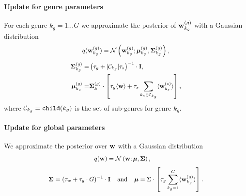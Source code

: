 \paragraph{Update for genre parameters}
\noindent For each genre $k_g=1\dots G$ we approximate the posterior of $\mathbf{w}^{(g)}_{k_g}$ with a Gaussian distribution
\begin{equation}
\begingroup\makeatletter\def\f@size{\fsize}\check@mathfonts
\def\maketag@@@#1{\hbox{\m@th\large\normalfont#1}}%
\begin{aligned}
q(\w^{(g)}_{k_g})=\mathcal{N}\left(\w^{(g)}_{k_g}; \bmu^{(g)}_{k_g}, \bSigma^{(g)}_{k_g} \right),
\end{aligned}\endgroup
\end{equation} 
\begin{equation}
\begingroup\makeatletter\def\f@size{\fsize}\check@mathfonts
\def\maketag@@@#1{\hbox{\m@th\large\normalfont#1}}%
\begin{aligned}
\bSigma^{(g)}_{k_g} = & \left(\tau_g+|\mathcal{C}_{k_g}|\tau_s\right)^{-1} \cdot  \textbf{I}, \nonumber \\
\bmu^{(g)}_{k_g}=&\bSigma^{(g)}_k \cdot\left[\tau_g \langle \w \rangle  +\tau_s\sum_{k_s\in \mathcal{C}_{k_g}}\langle \w^{(s)}_{k_s}\rangle \right],
\end{aligned}\endgroup
\end{equation}
where $\mathcal{C}_{k_g}=\texttt{child}(k_g)$ is the set of sub-genres for genre $k_g$.

\paragraph{Update for global parameters}
\noindent We approximate the posterior over $\mathbf{w}$ with a Gaussian distribution  
\begin{equation}
\begingroup\makeatletter\def\f@size{\fsize}\check@mathfonts
\def\maketag@@@#1{\hbox{\m@th\large\normalfont#1}}%
\begin{aligned}
& q(\w)=\mathcal{N}\left(\w ; \bmu, \bSigma \right), 
\label{eq:q_w}
\end{aligned}\endgroup
\end{equation} 
\begin{equation}
\begingroup\makeatletter\def\f@size{\fsize}\check@mathfonts
\def\maketag@@@#1{\hbox{\m@th\large\normalfont#1}}%
\begin{aligned}
\bSigma=\left(\tau_w+ \tau_g \cdot G \right)^{-1} \cdot \I \quad \text{and} \quad \bmu=\Sigma\cdot\left[\tau_g\sum_{k_g=1}^{G} \langle \w^{(g)}_{k_g} \rangle \right]. \nonumber
\end{aligned}\endgroup
\end{equation}

